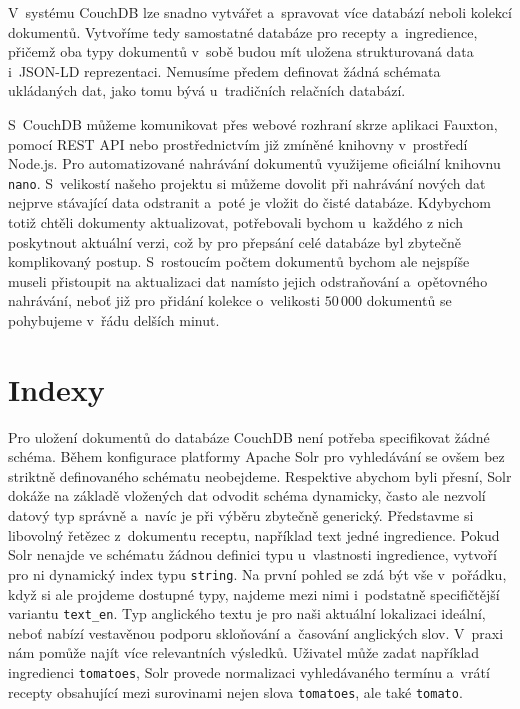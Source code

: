V~systému CouchDB lze snadno vytvářet a~spravovat více databází neboli kolekcí dokumentů. Vytvoříme tedy samostatné databáze pro recepty a~ingredience, přičemž oba typy dokumentů v~sobě budou mít uložena strukturovaná data i~JSON-LD reprezentaci. Nemusíme předem definovat žádná schémata ukládaných dat, jako tomu bývá u~tradičních relačních databází.

S~CouchDB můžeme komunikovat přes webové rozhraní skrze aplikaci Fauxton, pomocí REST API nebo prostřednictvím již zmíněné knihovny v~prostředí Node.js. Pro automatizované nahrávání dokumentů využijeme oficiální knihovnu \texttt{nano}. S~velikostí našeho projektu si můžeme dovolit při nahrávání nových dat nejprve stávající data odstranit a~poté je vložit do čisté databáze. Kdybychom totiž chtěli dokumenty aktualizovat, potřebovali bychom u~každého z nich poskytnout aktuální verzi, což by pro přepsání celé databáze byl zbytečně komplikovaný postup. S~rostoucím počtem dokumentů bychom ale nejspíše museli přistoupit na aktualizaci dat namísto jejich odstraňování a~opětovného nahrávání, neboť již pro přidání kolekce o~velikosti $50\,000$ dokumentů se pohybujeme v~řádu delších minut.

\section{Indexy}

Pro uložení dokumentů do databáze CouchDB není potřeba specifikovat žádné schéma. Během konfigurace platformy Apache Solr pro vyhledávání se ovšem bez striktně definovaného schématu neobejdeme. Respektive abychom byli přesní, Solr dokáže na základě vložených dat odvodit schéma dynamicky, často ale nezvolí datový typ správně a~navíc je při výběru zbytečně generický. Představme si libovolný řetězec z~dokumentu receptu, například text jedné ingredience. Pokud Solr nenajde ve schématu žádnou definici typu u~vlastnosti ingredience, vytvoří pro ni dynamický index typu \texttt{string}. Na první pohled se zdá být vše v~pořádku, když si ale projdeme dostupné typy, najdeme mezi nimi i~podstatně specifičtější variantu \texttt{text\_en}. Typ anglického textu je pro naši aktuální lokalizaci ideální, neboť nabízí vestavěnou podporu skloňování a~časování anglických slov. V~praxi nám pomůže najít více relevantních výsledků. Uživatel může zadat například ingredienci \texttt{tomatoes}, Solr provede normalizaci vyhledávaného termínu a~vrátí recepty obsahující mezi surovinami nejen slova \texttt{tomatoes}, ale také \texttt{tomato}.

